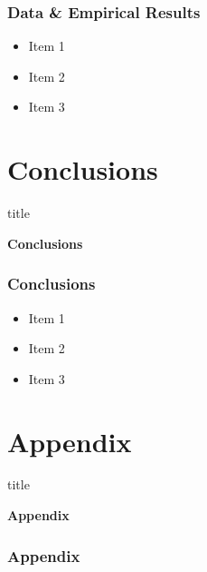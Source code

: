 \documentclass[11pt]{beamer}
\begin{document}
\begin{frame}

	\frametitle{\bfseries Data \& Empirical Results}
	\begin{itemize}
		\item Item 1
		\item Item 2
		\item Item 3
	\end{itemize}
\end{frame}

\section[Conclusions]{Conclusions}
\begin{frame}
	\begin{beamercolorbox}{title}
		\begin{center}
			\bfseries \huge Conclusions
		\end{center}	
	\end{beamercolorbox}
	
\end{frame}

\begin{frame}

	\frametitle{\bfseries Conclusions}
	\begin{itemize}
		\item Item 1
		\item Item 2
		\item Item 3
	\end{itemize}
\end{frame}

\section[Appendix]{Appendix}
\begin{frame}
	\begin{beamercolorbox}{title}
		\begin{center}
			\bfseries \huge Appendix
		\end{center}	
	\end{beamercolorbox}
	
\end{frame}

\begin{frame}
	
	\frametitle{\bfseries Appendix}
\end{frame}
\end{document}
